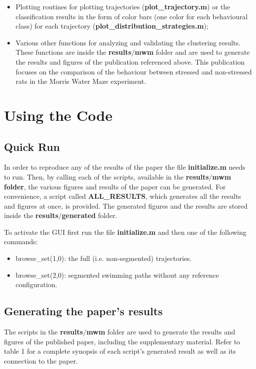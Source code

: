 \documentclass[12pt,titlepage]{article}
\begin{document}
\begin{doublespace}
\begin{itemize}
	\item Plotting routines for plotting trajectories (\textbf{plot\_trajectory.m}) or the classification results in the form of color bars (one color for each behavioural class) for each trajectory (\textbf{plot\_distribution\_strategies.m});
	
	\item Various other functions for analyzing and validating the clustering results. These functions are inside the \textbf{results$/$mwm} folder and are used to generate the results and figures of the publication referenced above. This publication focuses on the comparison of the behaviour between stressed and non-stressed rats in the Morris Water Maze experiment.
\end{itemize}


\section{Using the Code}
\subsection{Quick Run}

In order to reproduce any of the results of the paper the file \textbf{initialize.m} needs to run. Then, by calling each of the scripts, available in the \textbf{results$/$mwm folder}, the various figures and results of the paper can be generated. For convenience, a script called \textbf{ALL\_RESULTS}, which generates all the results and figures at once, is provided. The generated figures and the results are stored inside the \textbf{results$/$generated} folder.

To activate the GUI first run the file \textbf{initialize.m} and then one of the following commands:
\begin{itemize}
	\item browse\_set(1,0): the full (i.e. non-segmented) trajectories.
	\item browse\_set(2,0): segmented swimming paths without any reference configuration.
\end{itemize}

\subsection{Generating the paper's results}

The scripts in the \textbf{results$/$mwm} folder are used to generate the results and figures of the published paper, including the supplementary material. Refer to table 1 for a complete synopsis of each script's generated result as well as its connection to the paper.


\end{doublespace}
\end{document}
